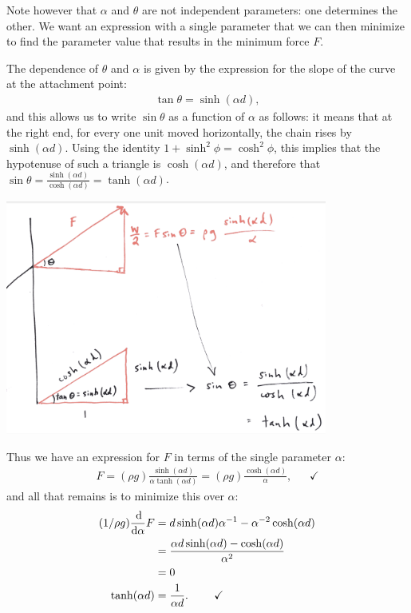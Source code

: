 Note however that $\alpha$ and $\theta$ are not independent parameters: one determines the other. We
want an expression with a single parameter that we can then minimize to find the parameter value
that results in the minimum force $F$.

The dependence of $\theta$ and $\alpha$ is given by the expression for the slope of the curve at the
attachment point:
\begin{align*}
  \tan\theta = \sinh(\alpha d),
\end{align*}
and this allows us to write $\sin\theta$ as a function of $\alpha$ as follows: it means that at the
right end, for every one unit moved horizontally, the chain rises by $\sinh(\alpha d)$. Using the
identity $1 + \sinh^2\phi = \cosh^2\phi$, this implies that the hypotenuse of such a triangle is
$\cosh(\alpha d)$, and therefore that
$\sin\theta = \frac{\sinh(\alpha d)}{\cosh(\alpha d)} = \tanh(\alpha d)$.

\begin{mdframed}
  \includegraphics[width=300pt]{img/physics--classical-mechanics--morin--2-9-diagram.png}
\end{mdframed}

Thus we have an expression for $F$ in terms of the single parameter $\alpha$:
\begin{align*}
  F = (\rho g)\frac{\sinh(\alpha d)}{\alpha \tanh(\alpha d)} = (\rho g)\frac{\cosh(\alpha d)}{\alpha}, ~~~~~~~\checkmark
\end{align*}
and all that remains is to minimize this over $\alpha$:
\begin{align*}
  (1/\rho g)\frac{\dif}{\dif\alpha} F &= d\sinh(\alpha d)\alpha^{-1} -\alpha^{-2}\cosh(\alpha d) \\
                                      &= \frac{\alpha d \sinh(\alpha d) - \cosh(\alpha d)}{\alpha^2} \\
                                      &= 0 \\
                      \tanh(\alpha d) &= \frac{1}{\alpha d}. ~~~~~~~\checkmark
\end{align*}


